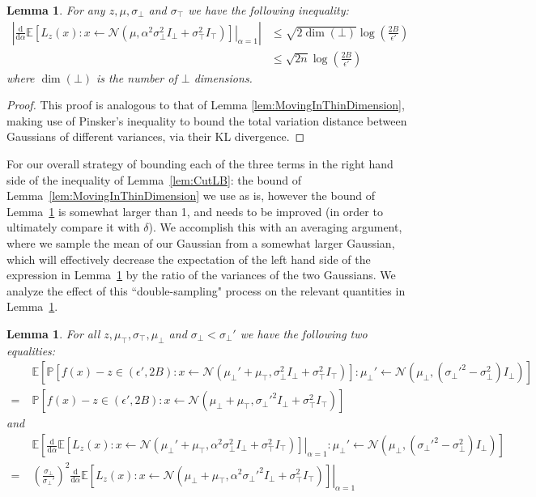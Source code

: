 \documentclass[11pt,letter]{article}
\renewcommand{\Pr}{\mathbb{P}}
\newcommand{\Exp}{\mathbb{E}}
\newcommand{\from}{\leftarrow}
\newcommand{\Normal}{\mathcal{N}}
\renewcommand{\d}{\mathrm{d}}
\newcommand{\Diff}[2][]{\frac{\d#1}{\d#2}}
\newcommand{\perr}{\delta}
\newcounter{nTheorems}
\numberwithin{nTheorems}{section}
\newtheorem{lemma}[nTheorems]{Lemma}
\begin{document}
\begin{lemma}
\label{lem:Isoperimetric}
For any $z, \mu, \sigma_\bot$ and $\sigma_\top$ we have the following inequality:
\begin{align*}
\left|\left.\Diff{\alpha} \Exp\left[L_z(x) : x \from \Normal(\mu, \alpha^2\sigma_\bot^2 I_\bot + \sigma_\top^2 I_\top) \right]\right|_{\alpha = 1}\right| &\le \sqrt{2\dim(\bot)}\log\left(\frac{2B}{\epsilon'}\right)\\
&\le \sqrt{2n}\log\left(\frac{2B}{\epsilon'}\right)
\end{align*}
where $\dim(\bot)$ is the number of $\bot$ dimensions.
\end{lemma}

\begin{proof}
This proof is analogous to that of Lemma \ref{lem:MovingInThinDimension}, making use of Pinsker's inequality to bound the total variation distance between Gaussians of different variances, via their KL divergence.
\end{proof}

For our overall strategy of bounding each of the three terms in the right hand side of the inequality of Lemma~\ref{lem:CutLB}: the bound of Lemma~\ref{lem:MovingInThinDimension} we use as is, however the bound of Lemma~\ref{lem:Isoperimetric} is somewhat larger than 1, and needs to be improved (in order to ultimately compare it with $\perr$). We accomplish this with an averaging argument, where we sample the mean of our Gaussian from a somewhat larger Gaussian, which will effectively decrease the expectation of the left hand side of the expression in Lemma~\ref{lem:Isoperimetric} by the ratio of the variances of the two Gaussians. We analyze the effect of this ``double-sampling" process on the relevant quantities in Lemma~\ref{lem:DoubleSampling}.
\begin{lemma}
\label{lem:DoubleSampling}
For all $z, \mu_\top, \sigma_\top, \mu_\bot$ and $\sigma_\bot < \sigma_\bot'$ we have the following two equalities:
\begin{align*}
&\Exp[\Pr[f(x)-z \in (\epsilon',2B) : x \from \Normal(\mu_\bot' + \mu_\top, \sigma_\bot^2 I_\bot + \sigma_\top^2 I_\top)] : \mu_\bot' \from \Normal(\mu_\bot, (\sigma_\bot'^2 - \sigma_\bot^2)I_\bot)]\\
=\;&\Pr[f(x)-z \in (\epsilon',2B) : x \from \Normal(\mu_\bot + \mu_\top, \sigma_\bot'^2 I_\bot + \sigma_\top^2 I_\top)]
\end{align*}
and\begin{align*}
&\Exp\left[\left.\Diff{\alpha} \Exp\left[L_z(x) : x \from \Normal(\mu_\bot' + \mu_\top, \alpha^2\sigma_\bot^2 I_\bot + \sigma_\top^2 I_\top) \right]\right|_{\alpha = 1} : \mu_\bot' \from \Normal(\mu_\bot, (\sigma_\bot'^2 - \sigma_\bot^2)I_\bot)\right]\\
=\;&\left(\frac{\sigma_\bot}{\sigma_\bot'}\right)^2\left.\Diff{\alpha} \Exp\left[L_z(x) : x \from \Normal(\mu_\bot + \mu_\top, \alpha^2\sigma_\bot'^2 I_\bot + \sigma_\top^2 I_\top) \right]\right|_{\alpha = 1}
\end{align*}
\end{lemma}
\end{document}
